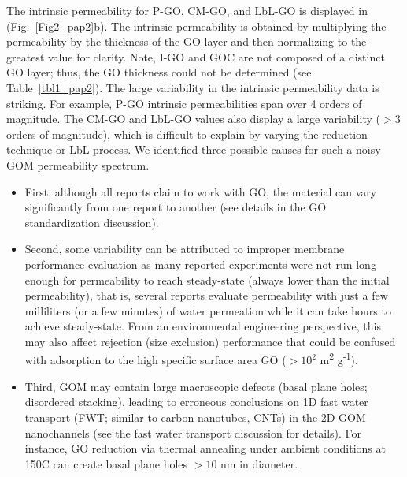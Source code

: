The intrinsic permeability for P-GO, CM-GO, and LbL-GO is displayed in (Fig.~\ref{Fig2_pap2}b). The intrinsic permeability is obtained by multiplying the permeability by the thickness of the GO layer and then normalizing to the greatest value for clarity. Note, I-GO and GOC are not composed of a distinct GO layer; thus, the GO thickness could not be determined (see Table~\ref{tbl1_pap2}). The large variability in the intrinsic permeability data is striking. For example, P-GO intrinsic permeabilities span over 4 orders of magnitude. The CM-GO and LbL-GO values also display a large variability ($>3$ orders of magnitude), which is difficult to explain by varying the reduction technique or LbL process. We identified three possible causes for such a noisy GOM permeability spectrum.
\begin{itemize}
 \item First, although all reports claim to work with GO, the material can vary significantly from one report to another (see details in the GO standardization discussion).
 \item Second, some variability can be attributed to improper membrane performance evaluation as many reported experiments were not run long enough for permeability to reach steady-state (always lower than the initial permeability), that is, several reports evaluate permeability with just a few milliliters (or a few minutes) of water permeation while it can take hours to achieve steady-state. From an environmental engineering perspective, this may also affect rejection (size exclusion) performance that could be confused with adsorption to the high specific surface area GO ($>10^{2}$ m\textsuperscript{2} g\textsuperscript{-1}).\cite{yang2011removal,Graphenea}
 \item Third, GOM may contain large macroscopic defects (basal plane holes; disordered stacking), leading to erroneous conclusions on 1D fast water transport (FWT; similar to carbon nanotubes, CNTs) in the 2D GOM nanochannels (see the fast water transport discussion for details). For instance, GO reduction via thermal annealing under ambient conditions at 150\textdegree C can create basal plane holes $>10$ nm in diameter.\cite{qiu2011controllable}
\end{itemize}
